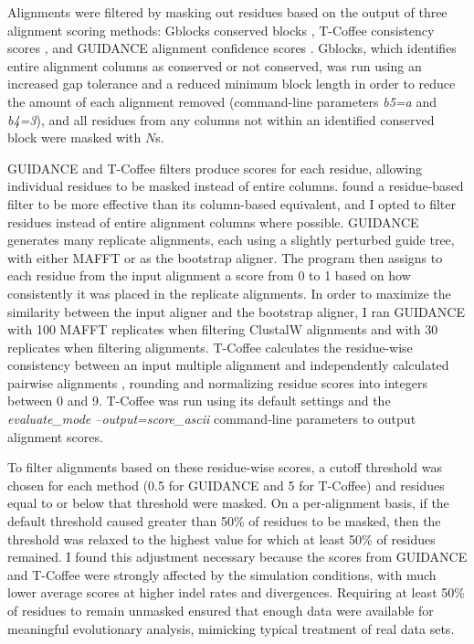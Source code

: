 Alignments were filtered by masking out residues based on the output
of three alignment scoring methods: Gblocks conserved blocks
\citep{Castresana2000Selection}, T-Coffee consistency scores
\citep{Notredame2000,Notredame2003Using}, and GUIDANCE
alignment confidence scores \citep{Penn2010Alignment}. Gblocks, which
identifies entire alignment columns as conserved or not conserved, was
run using an increased gap tolerance and a reduced minimum block
length in order to reduce the amount of each alignment removed
(command-line parameters {\em b5=a} and {\em b4=3}), and all residues
from any columns not within an identified conserved block were masked
with $N$s.

GUIDANCE and T-Coffee filters produce scores for each residue,
allowing individual residues to be masked instead of entire
columns. \citet{Privman2011Improving} found a residue-based filter to
be more effective than its column-based equivalent, and I opted to
filter residues instead of entire alignment columns where
possible. GUIDANCE generates many replicate alignments, each using a
slightly perturbed guide tree, with either MAFFT or \pranka as the
bootstrap aligner. The program then assigns to each residue from the
input alignment a score from 0 to 1 based on how consistently it was
placed in the replicate alignments. In order to maximize the
similarity between the input aligner and the bootstrap aligner, I ran
GUIDANCE with 100 MAFFT replicates when filtering ClustalW alignments
and with 30 \pranka replicates when filtering \prankc
alignments. T-Coffee calculates the residue-wise consistency between
an input multiple alignment and independently calculated pairwise
alignments \citep{Notredame2003Using}, rounding and normalizing
residue scores into integers between 0 and 9. T-Coffee was run using
its default settings and the {\em evaluate\_mode
  --output=score\_ascii} command-line parameters to output alignment
scores.

To filter alignments based on these residue-wise scores, a cutoff
threshold was chosen for each method (0.5 for GUIDANCE and 5 for
T-Coffee) and residues equal to or below that threshold were
masked. On a per-alignment basis, if the default threshold caused
greater than 50\% of residues to be masked, then the threshold was
relaxed to the highest value for which at least 50\% of residues
remained. I found this adjustment necessary because the scores from
GUIDANCE and T-Coffee were strongly affected by the simulation
conditions, with much lower average scores at higher indel rates and
divergences. Requiring at least 50\% of residues to remain unmasked
ensured that enough data were available for meaningful evolutionary
analysis, mimicking typical treatment of real data sets.

